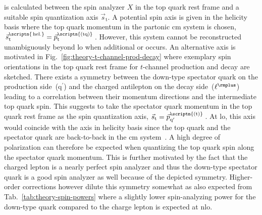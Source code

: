 is calculated between the spin analyzer $X$ in the top quark rest frame and a suitable spin quantization axis $\vec{s}_\mathrm{t}$. A potential spin axis is given in the helicity basis where the top quark momentum in the partonic \acrlong{cm} system is chosen, $\vec{s}_\mathrm{t}^\scriptn{\,\mathrm{hel.}}=\vec{p}_\mathrm{t}^\scriptn{\mathrm{(tq)}}$. However, this system cannot be reconstructed unambiguously beyond \gls{lo} when additional  or  occurs. An alternative axis is motivated in Fig.~\ref{fig:theory-t-channel-prod-decay} where exemplary spin orientations in the top quark rest frame for $t$-channel production and decay are sketched. There exists a symmetry between the down-type spectator quark on the production side~($\mathrm{q}^\prime$) and the charged antilepton on the decay side~($\ell^{\rmplus}$) leading to a correlation between their momentum directions and the intermediate top quark spin. This suggests to take the spectator quark momentum in the top quark rest frame as the spin quantization axis, $\vec{s}_\mathrm{t}=\vec{p}_{\mathrm{q}^\prime}^\scriptn{\mathrm{(t)}}$\,. At \gls{lo}, this axis would coincide with the axis in helicity basis since the top quark and the spectator quark are back-to-back in the \acrlong{cm} system~\cite{Schwienhorst:2010je}. A high degree of polarization can therefore be expected when quantizing the top quark spin along the spectator quark momentum. This is further motivated by the fact that the charged lepton is a nearly perfect spin analyzer and thus the down-type spectator quark is a good spin analyzer as well because of the depicted symmetry. Higher-order corrections however dilute this symmetry somewhat as also expected from Tab.~\ref{tab:theory-spin-powers} where a slightly lower spin-analyzing power for the down-type quark compared to the charge lepton is expected at \gls{nlo}. 


